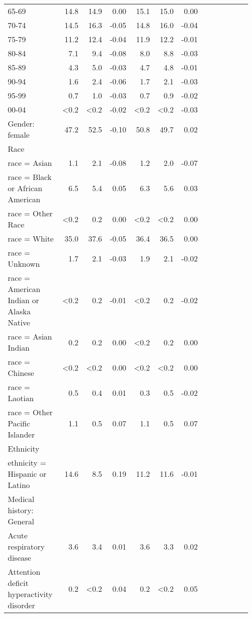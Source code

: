 \documentclass[11pt,]{article}
\begin{document}
\begin{longtable}{lrrrrrrrrrrrr}
      65-69 & 14.8 & 14.9 &  0.00 & 15.1 & 15.0 &  0.00 \\ 
      70-74 & 14.5 & 16.3 & -0.05 & 14.8 & 16.0 & -0.04 \\ 
      75-79 & 11.2 & 12.4 & -0.04 & 11.9 & 12.2 & -0.01 \\ 
      80-84 &  7.1 &  9.4 & -0.08 &  8.0 &  8.8 & -0.03 \\ 
      85-89 &  4.3 &  5.0 & -0.03 &  4.7 &  4.8 & -0.01 \\ 
      90-94 &  1.6 &  2.4 & -0.06 &  1.7 &  2.1 & -0.03 \\ 
      95-99 &  0.7 &  1.0 & -0.03 &  0.7 &  0.9 & -0.02 \\ 
      00-04 & <0.2 & <0.2 & -0.02 & <0.2 & <0.2 & -0.03 \\ 
  Gender: female & 47.2 & 52.5 & -0.10 & 50.8 & 49.7 &  0.02 \\ 
  Race &    &    &     &    &    &     \\ 
      race = Asian &  1.1 &  2.1 & -0.08 &  1.2 &  2.0 & -0.07 \\ 
      race = Black or African American &  6.5 &  5.4 &  0.05 &  6.3 &  5.6 &  0.03 \\ 
      race = Other Race & <0.2 &  0.2 &  0.00 & <0.2 & <0.2 &  0.00 \\ 
      race = White & 35.0 & 37.6 & -0.05 & 36.4 & 36.5 &  0.00 \\ 
      race = Unknown &  1.7 &  2.1 & -0.03 &  1.9 &  2.1 & -0.02 \\ 
      race = American Indian or Alaska Native & <0.2 &  0.2 & -0.01 & <0.2 &  0.2 & -0.02 \\ 
      race = Asian Indian &  0.2 &  0.2 &  0.00 & <0.2 &  0.2 &  0.00 \\ 
      race = Chinese & <0.2 & <0.2 &  0.00 & <0.2 & <0.2 &  0.00 \\ 
      race = Laotian &  0.5 &  0.4 &  0.01 &  0.3 &  0.5 & -0.02 \\ 
      race = Other Pacific Islander &  1.1 &  0.5 &  0.07 &  1.1 &  0.5 &  0.07 \\ 
  Ethnicity &    &    &     &    &    &     \\ 
      ethnicity = Hispanic or Latino & 14.6 &  8.5 &  0.19 & 11.2 & 11.6 & -0.01 \\ 
  Medical history: General &    &    &     &    &    &     \\ 
      Acute respiratory disease &  3.6 &  3.4 &  0.01 &  3.6 &  3.3 &  0.02 \\ 
      Attention deficit hyperactivity disorder &  0.2 & <0.2 &  0.04 &  0.2 & <0.2 &  0.05 \\ 

\end{longtable}
\end{document}

